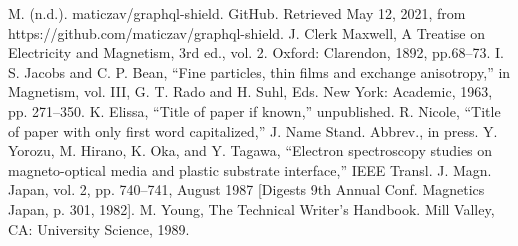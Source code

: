 \documentclass[conference]{IEEEtran}
\begin{document}
\begin{thebibliography}{00}
 M. (n.d.). maticzav/graphql-shield. GitHub. Retrieved May 12, 2021, from https://github.com/maticzav/graphql-shield.
 J. Clerk Maxwell, A Treatise on Electricity and Magnetism, 3rd ed., vol. 2. Oxford: Clarendon, 1892, pp.68--73.
 I. S. Jacobs and C. P. Bean, ``Fine particles, thin films and exchange anisotropy,'' in Magnetism, vol. III, G. T. Rado and H. Suhl, Eds. New York: Academic, 1963, pp. 271--350.
 K. Elissa, ``Title of paper if known,'' unpublished.
 R. Nicole, ``Title of paper with only first word capitalized,'' J. Name Stand. Abbrev., in press.
 Y. Yorozu, M. Hirano, K. Oka, and Y. Tagawa, ``Electron spectroscopy studies on magneto-optical media and plastic substrate interface,'' IEEE Transl. J. Magn. Japan, vol. 2, pp. 740--741, August 1987 [Digests 9th Annual Conf. Magnetics Japan, p. 301, 1982].
 M. Young, The Technical Writer's Handbook. Mill Valley, CA: University Science, 1989.
\end{thebibliography}
\end{document}
